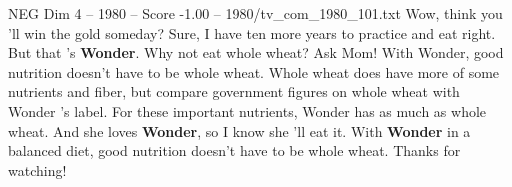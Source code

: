 \begin{textsample}{NEG Dim 4 – 1980 – Score -1.00 – 1980/tv\_com\_1980\_101.txt}  \label{ex:f4_neg_039}
Wow, think you 'll win the gold someday?
Sure, I have ten more years to practice and eat right.
But that 's \textbf{Wonder}.
Why not eat whole wheat?
Ask Mom!
With Wonder, good nutrition doesn't have to be whole wheat.
Whole wheat does have more of some nutrients and fiber, but compare government figures on whole wheat with Wonder 's label.
For these important nutrients, Wonder has as much as whole wheat.
And she loves \textbf{Wonder}, so I know she 'll eat it.
With \textbf{Wonder} in a balanced diet, good nutrition doesn't have to be whole wheat.
Thanks for watching!

\end{textsample}

